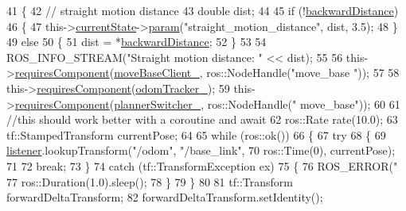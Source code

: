 \begin{DoxyCode}
41     \{
42         \textcolor{comment}{// straight motion distance}
43         \textcolor{keywordtype}{double} dist;
44 
45         \textcolor{keywordflow}{if} (!\hyperlink{classSbNavigateBackwards_ad7e0e6b09dae085c1106335e208d6e84}{backwardDistance})
46         \{
47             this->\hyperlink{classsmacc_1_1SmaccSubStateBehavior_a62e2b9da4a446f09396d0b4c01659b88}{currentState}->\hyperlink{classsmacc_1_1ISmaccState_a4982f2187ed6da337462721146e8ef70}{param}(\textcolor{stringliteral}{"straight\_motion\_distance"}, dist, 3.5);
48         \}
49         \textcolor{keywordflow}{else}
50         \{
51             dist = *\hyperlink{classSbNavigateBackwards_ad7e0e6b09dae085c1106335e208d6e84}{backwardDistance};
52         \}
53 
54         ROS\_INFO\_STREAM(\textcolor{stringliteral}{"Straight motion distance: "} << dist);
55 
56         this->\hyperlink{classsmacc_1_1SmaccSubStateBehavior_a4d25c4ba8ec01c489df172a71bb1c37d}{requiresComponent}(\hyperlink{classSbNavigateBackwards_a7e46b20eb07e60685a5b88b12b341fd8}{moveBaseClient\_}, ros::NodeHandle(\textcolor{stringliteral}{"move\_base
      "}));
57         
58         this->\hyperlink{classsmacc_1_1SmaccSubStateBehavior_a4d25c4ba8ec01c489df172a71bb1c37d}{requiresComponent}(\hyperlink{classSbNavigateBackwards_a570fa48348a172b3db7bcb5f486017b1}{odomTracker\_});
59         this->\hyperlink{classsmacc_1_1SmaccSubStateBehavior_a4d25c4ba8ec01c489df172a71bb1c37d}{requiresComponent}(\hyperlink{classSbNavigateBackwards_a941dc2026876a1d8c35818c6feac768a}{plannerSwitcher\_}, ros::NodeHandle(\textcolor{stringliteral}{"
      move\_base"}));
60 
61         \textcolor{comment}{//this should work better with a coroutine and await}
62         ros::Rate rate(10.0);
63         tf::StampedTransform currentPose;
64 
65         \textcolor{keywordflow}{while} (ros::ok())
66         \{
67             \textcolor{keywordflow}{try}
68             \{
69                 \hyperlink{classSbNavigateBackwards_a23f881d6f742d683a2f6b671c21688cc}{listener}.lookupTransform(\textcolor{stringliteral}{"/odom"}, \textcolor{stringliteral}{"/base\_link"}, 
70                                          ros::Time(0), currentPose);
71 
72                 \textcolor{keywordflow}{break};
73             \}
74             \textcolor{keywordflow}{catch} (tf::TransformException ex)
75             \{
76                 ROS\_ERROR(\textcolor{stringliteral}{"%
77                 ros::Duration(1.0).sleep();
78             \}
79         \}
80 
81         tf::Transform forwardDeltaTransform;
82         forwardDeltaTransform.setIdentity();
}
\end{DoxyCode}
